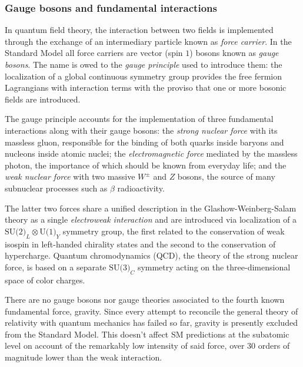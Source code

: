 \subsubsection{Gauge bosons and fundamental interactions}
In quantum field theory, the interaction between two fields is implemented through the exchange of an intermediary particle known as \textit{force carrier}.
In the Standard Model all force carriers are vector (spin $1$) bosons known as \textit{gauge bosons}.
The name is owed to the \textit{gauge principle} used to introduce them: the localization of a global continuous symmetry group provides the free fermion Lagrangians with interaction terms with the proviso that one or more bosonic fields are introduced.


The gauge principle accounts for the implementation of three fundamental interactions along with their gauge bosons: 
the \textit{strong nuclear force} with its massless gluon, responsible for the binding of both quarks inside baryons and nucleons inside atomic nuclei; the \textit{electromagnetic force} mediated by the massless photon, the importance of which should be known from everyday life; and the \textit{weak nuclear force} with two massive $W^\pm$ and $Z$ bosons, the source of many subnuclear processes such as $\beta$ radioactivity.

The latter two forces share a unified description in the Glashow-Weinberg-Salam theory as a single \textit{electroweak interaction} and are introduced via localization of a $\text{SU(2)}_L \otimes \text{U(1)}_Y$ symmetry group, the first related to the conservation of weak isospin in left-handed chirality states and the second to the conservation of hypercharge.
Quantum chromodynamics (QCD), the theory of the strong nuclear force, is based on a separate $\text{SU(3)}_C$ symmetry acting on the three-dimensional space of color charges.

There are no gauge bosons nor gauge theories associated to the fourth known fundamental force, gravity.
Since every attempt to reconcile the general theory of relativity with quantum mechanics has failed so far, gravity is presently excluded from the Standard Model.
This doesn't affect SM predictions at the subatomic level on account of the remarkably low intensity of said force, over 30 orders of magnitude lower than the weak interaction.

